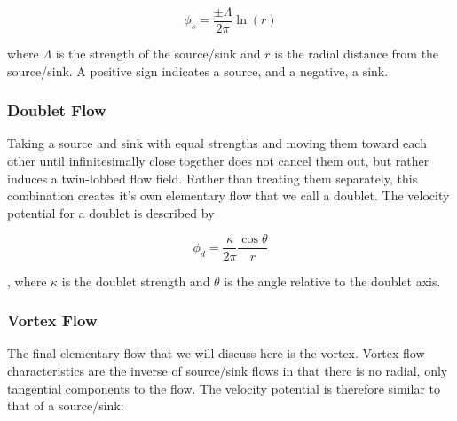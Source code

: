 \begin{marginfigure}
	
\end{marginfigure}


\begin{equation}
\label{eqn:sourceflow}
	\phi_s = \frac{\pm\Lambda}{2\pi} \ln(r)
\end{equation}

\noindent where \(\Lambda\) is the strength of the source/sink and \(r\) is the radial distance from the source/sink.
A positive sign indicates a source, and a negative, a sink.


\subsubsection{Doublet Flow}

\begin{marginfigure}
	
\end{marginfigure}

Taking a source and sink with equal strengths and moving them toward each other until infinitesimally close together does not cancel them out, but rather induces a twin-lobbed flow field.
Rather than treating them separately, this combination creates it's own elementary flow that we call a doublet.
The velocity potential for a doublet is described by

\begin{equation}
\label{eqn:doubletflow}
	\phi_d = \frac{\kappa}{2\pi} \frac{\cos\theta}{r}
\end{equation}

\noindent, where \(\kappa\) is the doublet strength and \(\theta\) is the angle relative to the doublet axis.

\subsubsection{Vortex Flow}

The final elementary flow that we will discuss here is the vortex.
Vortex flow characteristics are the inverse of source/sink flows in that there is no radial, only tangential components to the flow.
The velocity potential is therefore similar to that of a source/sink:

\begin{marginfigure}
	
\end{marginfigure}

